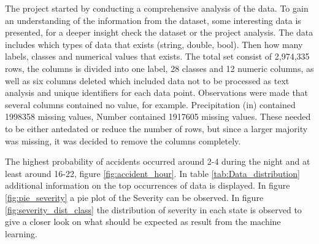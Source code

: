 \documentclass[../main.tex]{subfiles}
\begin{document}
The project started by conducting a comprehensive analysis of the data. To gain an understanding of the information from the dataset, some interesting data is presented, for a deeper insight check the dataset or the project analysis. The data includes which types of data that exists (string, double, bool). Then how many labels, classes and numerical values that exists. The total set consist of 2,974,335 rows, the columns is divided into one label, 28 classes and 12 numeric columns, as well as six columns deleted which included data not to be processed as text analysis and unique identifiers for each data point. Observations were made that several columns contained no value, for example. Precipitation (in) contained 1998358 missing values, Number contained 1917605 missing values. These needed to be either antedated or reduce the number of rows, but since a larger majority was missing, it was decided to remove the columns completely. 
\begin{table}[H]
\centering
{}
\caption{Oversight of data. The parentheses containing the observed data point and number of occurances of the category.}
\label{tab:Data_distribution}
\end{table}

The highest probability of accidents occurred around 2-4 during the night and at least around 16-22, figure \ref{fig:accident_hour}. In table \ref{tab:Data_distribution} additional information on the top occurrences of data is displayed. In figure \ref{fig:pie_severity} a pie plot of the Severity can be observed. In figure \ref{fig:severity_dist_class} the distribution of severity in each state is observed to give a closer look on what should be expected as result from the machine learning.
\end{document}

